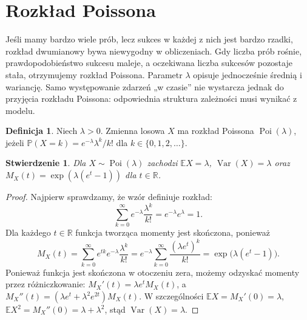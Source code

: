 \documentclass[11pt,a4paper,oneside]{report}
\numberwithin{equation}{chapter}
\theoremstyle{plain}
\newtheorem{stwierdzenie}[twierdzenie]{Stwierdzenie}
\theoremstyle{definition}
\newtheorem{definicja}{Definicja}[chapter]
\theoremstyle{remark}
\newcommand{\R}{\mathbb{R}}
\newcommand{\Prob}{\mathbb{P}}
\newcommand{\E}{\mathbb{E}}
\newcommand{\Var}{\operatorname{Var}}
\newcommand{\Poi}{\operatorname{Poi}}
\begin{document}
\section{Rozkład Poissona}
Jeśli mamy bardzo wiele prób, lecz sukces w każdej z nich jest
bardzo rzadki, rozkład dwumianowy bywa niewygodny w obliczeniach.
Gdy liczba prób rośnie, prawdopodobieństwo sukcesu maleje, a
oczekiwana liczba sukcesów pozostaje stała, otrzymujemy
rozkład Poissona. Parametr $\lambda$ opisuje jednocześnie
średnią i wariancję. Samo występowanie zdarzeń „w czasie” nie
wystarcza jednak do przyjęcia rozkładu Poissona: odpowiednia
struktura zależności musi wynikać z modelu.

\begin{definicja}
Niech $\lambda>0$. Zmienna losowa $X$ ma rozkład Poissona
$\Poi(\lambda)$, jeżeli
$\Prob(X=k)=e^{-\lambda}\lambda^k/k!$ dla
$k\in\{0,1,2,\ldots\}$.
\end{definicja}

\begin{stwierdzenie}
Dla $X\sim\Poi(\lambda)$ zachodzi
$\E X=\lambda$, $\Var(X)=\lambda$ oraz
$M_X(t)=\exp(\lambda(e^t-1))$ dla $t\in\R$.
\end{stwierdzenie}
\begin{proof}
Najpierw sprawdzamy, że wzór definiuje rozkład:
\[
\sum_{k=0}^\infty e^{-\lambda}\frac{\lambda^k}{k!}
=e^{-\lambda}e^\lambda=1.
\]
Dla każdego $t\in\R$ funkcja tworząca momenty jest
skończona, ponieważ
\[
M_X(t)=\sum_{k=0}^\infty e^{tk}
 e^{-\lambda}\frac{\lambda^k}{k!}
=e^{-\lambda}\sum_{k=0}^\infty\frac{(\lambda e^t)^k}{k!}
=\exp\bigl(\lambda(e^t-1)\bigr).
\]
Ponieważ funkcja jest skończona w otoczeniu zera,
możemy odzyskać momenty przez różniczkowanie:
$M_X'(t)=\lambda e^tM_X(t)$,
a $M_X''(t)=(\lambda e^t+\lambda^2e^{2t})M_X(t)$.
W szczególności $\E X=M_X'(0)=\lambda$,
$\E X^2=M_X''(0)=\lambda+\lambda^2$,
stąd $\Var(X)=\lambda$.
\end{proof}
\end{document}

